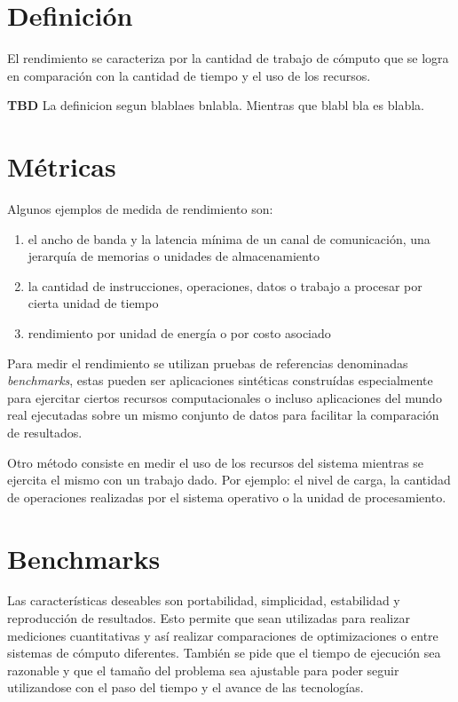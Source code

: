 \documentclass[a4paper]{report}
\begin{document}
\section{Definici\'on}

El rendimiento se caracteriza por la cantidad de trabajo de c\'omputo que se
logra en comparaci\'on con la cantidad de tiempo y el uso de los recursos.

\bigskip

{\bf TBD} La definicion segun blablaes bnlabla.
Mientras que blabl bla es blabla.

\section{M\'etricas}

Algunos ejemplos de medida de rendimiento son:

\begin{enumerate}
\item el ancho de banda y la latencia m\'inima de un canal de comunicaci\'on,
  una jerarqu\'ia de memorias o unidades   de almacenamiento
\item la cantidad de instrucciones, operaciones, datos o trabajo a procesar
  por cierta unidad de tiempo
\item rendimiento por unidad de energ\'ia o por costo asociado
\end{enumerate}

Para medir el rendimiento se utilizan pruebas de referencias denominadas
{\em benchmarks}, estas pueden ser aplicaciones sint\'eticas constru\'idas
especialmente para ejercitar ciertos recursos computacionales o incluso
aplicaciones del mundo real ejecutadas sobre un mismo conjunto de datos para
facilitar la comparaci\'on de resultados.

\bigskip

Otro m\'etodo consiste en medir el uso de los recursos del sistema mientras se
ejercita el mismo con un trabajo dado. Por ejemplo: el nivel de carga, la
cantidad de operaciones realizadas por el sistema operativo o la unidad de
procesamiento.

\section{Benchmarks}

Las caracter\'isticas deseables son portabilidad, simplicidad, estabilidad y
reproducci\'on de resultados. Esto permite que sean utilizadas para realizar
mediciones cuantitativas y as\'i realizar comparaciones de optimizaciones o
entre sistemas de c\'omputo diferentes. Tambi\'en se pide que el tiempo de
ejecuci\'on sea razonable y que el tama\~no del problema sea ajustable para
poder seguir utilizandose con el paso del tiempo y el avance de las
tecnolog\'ias.
\end{document}
